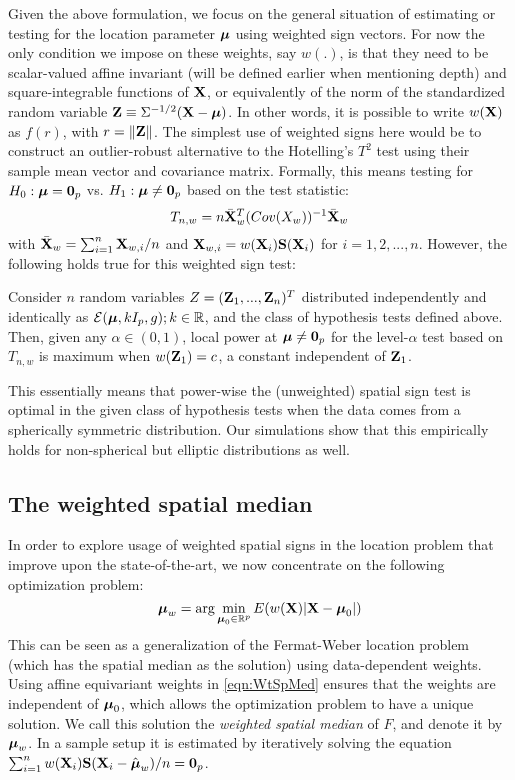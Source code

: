 \documentclass[fleqn,11pt]{article}
\begin{document}
Given the above formulation, we focus on the general situation of estimating or testing for the location parameter ${\boldsymbol{\mu}}$ using weighted sign vectors. For now the only condition we impose on these weights, say $w(.)$, is that they need to be scalar-valued affine invariant ({\colrbf will be defined earlier when mentioning depth}) and square-integrable functions of ${\mathbf{X}}$, or equivalently of the norm of the standardized random variable ${\mathbf{Z}} \equiv \Sigma^{-1/2} ({\mathbf{X}} - {\boldsymbol{\mu}})$. In other words, it is possible to write $w({\mathbf{X}})$ as $f(r)$, with $r = \| {\mathbf{Z}} \|$. The simplest use of weighted signs here would be to construct an outlier-robust alternative to the Hotelling's $T^2$ test using their sample mean vector and covariance matrix. Formally, this means testing for $H_0: {\boldsymbol{\mu}} = {\bf 0}_p$ vs. $H_1:{\boldsymbol{\mu}} \neq {\bf 0}_p$  based on the test statistic:
%
$$ T_{n,w} = n \bar{{\mathbf{X}}}_w^T ( Cov (X_w))^{-1} \bar{{\mathbf{X}}}_w $$
%
with $\bar{{\mathbf{X}}}_w = \sum_{i=1}^n {\mathbf{X}}_{w,i}/n$ and ${\mathbf{X}}_{w,i} = w({\mathbf{X}}_i ) {\mathbf{S}} ({\mathbf{X}}_i)$ for $i=1,2,...,n$. However, the following holds true for this weighted sign test:
%
\begin{Proposition}\label{proposition:SignTest}
Consider $n$ random variables $Z = ({\mathbf{Z}}_1,...,{\mathbf{Z}}_n)^T$ distributed independently and identically as $\mathcal{E}( {\boldsymbol{\mu}}, kI_p, g); k \in \mathbb R$, and the class of hypothesis tests defined above. Then, given any $\alpha \in (0,1)$, local power at ${\boldsymbol{\mu}} \neq {\bf 0}_p$ for the level-$\alpha$ test  based on $T_{n,w}$ is maximum when $w({\mathbf{Z}}_1) = c$, a constant independent of ${\mathbf{Z}}_1$.
\end{Proposition}
%
\noindent This essentially means that power-wise the (unweighted) spatial sign test \citep{OjaBook10} is optimal in the given class of hypothesis tests when the data comes from a spherically symmetric distribution. Our simulations show that this empirically holds for non-spherical but elliptic distributions as well.

\subsection{The weighted spatial median} 

In order to explore usage of weighted spatial signs in the location problem that improve upon the state-of-the-art, we now concentrate on the following optimization problem:
%
\begin{equation}\label{eqn:WtSpMed}
{\boldsymbol{\mu}}_w = \text{arg}\min_{{\boldsymbol{\mu}}_0 \in \mathbb{R}^p} E ( w({\mathbf{X}}) | {\mathbf{X}} - {\boldsymbol{\mu}}_0 |)
\end{equation}
%
This can be seen as a generalization of the Fermat-Weber location problem (which has the spatial median \citep{brown83, Chaudhuri96} as the solution) using data-dependent weights. Using affine equivariant weights in \ref{eqn:WtSpMed} ensures that the weights are independent of ${\boldsymbol{\mu}}_0$, which allows the optimization problem to have a unique solution. We call this solution the \textit{weighted spatial median} of $F$, and denote it by ${\boldsymbol{\mu}}_w$. In a sample setup it is estimated by iteratively solving the equation $\sum_{i=1}^n w({\mathbf{X}}_i) {\mathbf{S}} ({\mathbf{X}}_i - \hat{{\boldsymbol{\mu}}}_w)/n = {\bf 0}_p$.
\end{document}
